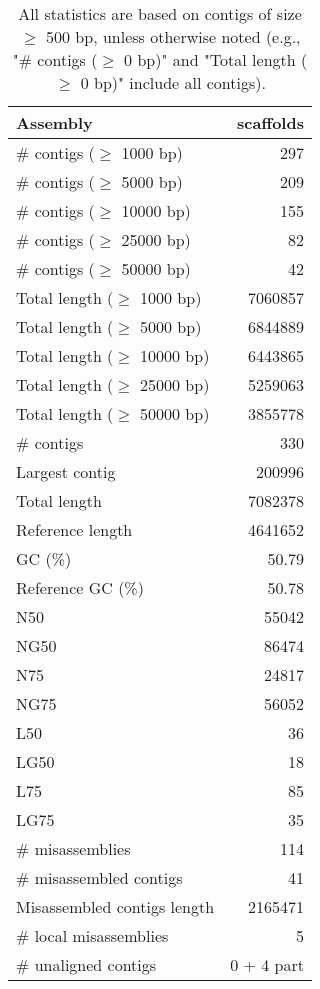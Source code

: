 \documentclass[12pt,a4paper]{article}
\begin{document}
\begin{table}[ht]
\begin{center}
\caption{All statistics are based on contigs of size $\geq$ 500 bp, unless otherwise noted (e.g., "\# contigs ($\geq$ 0 bp)" and "Total length ($\geq$ 0 bp)" include all contigs).}
\begin{tabular}{|l*{1}{|r}|}
\hline
Assembly & scaffolds \\ \hline
\# contigs ($\geq$ 1000 bp) & 297 \\ \hline
\# contigs ($\geq$ 5000 bp) & 209 \\ \hline
\# contigs ($\geq$ 10000 bp) & 155 \\ \hline
\# contigs ($\geq$ 25000 bp) & 82 \\ \hline
\# contigs ($\geq$ 50000 bp) & 42 \\ \hline
Total length ($\geq$ 1000 bp) & 7060857 \\ \hline
Total length ($\geq$ 5000 bp) & 6844889 \\ \hline
Total length ($\geq$ 10000 bp) & 6443865 \\ \hline
Total length ($\geq$ 25000 bp) & 5259063 \\ \hline
Total length ($\geq$ 50000 bp) & 3855778 \\ \hline
\# contigs & 330 \\ \hline
Largest contig & 200996 \\ \hline
Total length & 7082378 \\ \hline
Reference length & 4641652 \\ \hline
GC (\%) & 50.79 \\ \hline
Reference GC (\%) & 50.78 \\ \hline
N50 & 55042 \\ \hline
NG50 & 86474 \\ \hline
N75 & 24817 \\ \hline
NG75 & 56052 \\ \hline
L50 & 36 \\ \hline
LG50 & 18 \\ \hline
L75 & 85 \\ \hline
LG75 & 35 \\ \hline
\# misassemblies & 114 \\ \hline
\# misassembled contigs & 41 \\ \hline
Misassembled contigs length & 2165471 \\ \hline
\# local misassemblies & 5 \\ \hline
\# unaligned contigs & 0 + 4 part \\ \hline

\end{tabular}
\end{center}
\end{table}
\end{document}
